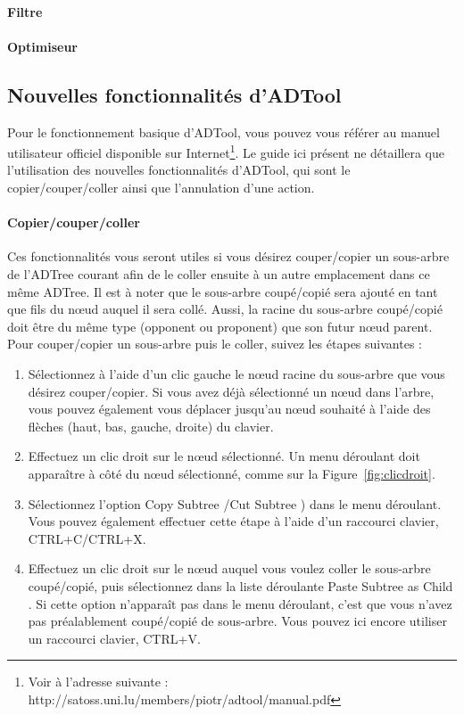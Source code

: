 \paragraph{Filtre}

\paragraph{Optimiseur}

\subsection{Nouvelles fonctionnalités d'ADTool}
\label{ssec:manuelADTool}

Pour le fonctionnement basique d'ADTool, vous pouvez vous référer au manuel utilisateur officiel disponible sur Internet\footnote{Voir à l'adresse suivante : http://satoss.uni.lu/members/piotr/adtool/manual.pdf}. Le guide ici présent ne détaillera que l'utilisation des nouvelles fonctionnalités d'ADTool, qui sont le copier/couper/coller ainsi que l'annulation d'une action.

\paragraph{Copier/couper/coller} Ces fonctionnalités vous seront utiles si vous désirez couper/copier un sous-arbre de l'ADTree courant afin de le coller ensuite à un autre emplacement dans ce même ADTree. Il est à noter que le sous-arbre coupé/copié sera ajouté en tant que fils du n\oe{}ud auquel il sera collé. Aussi, la racine du sous-arbre coupé/copié doit être du même type (opponent ou proponent) que son futur n\oe{}ud parent. Pour couper/copier un sous-arbre puis le coller, suivez les étapes suivantes : 
\begin{enumerate}
    \item Sélectionnez à l'aide d'un clic gauche le n\oe{}ud racine du sous-arbre que vous désirez couper/copier. Si vous avez déjà sélectionné un n\oe{}ud dans l'arbre, vous pouvez également vous déplacer jusqu'au n\oe{}ud souhaité à l'aide des flèches (haut, bas, gauche, droite) du clavier.
	\item Effectuez un clic droit sur le n\oe{}ud sélectionné. Un menu déroulant doit apparaître à côté du n\oe{}ud sélectionné, comme sur la {\sc Figure}~\ref{fig:clicdroit}.
	\item Sélectionnez l'option \og Copy Subtree \fg{}/\og Cut Subtree \fg{}) dans le menu déroulant. Vous pouvez également effectuer cette étape à l'aide d'un raccourci clavier, {\sc CTRL+C}/{\sc CTRL+X}.
	\item Effectuez un clic droit sur le n\oe{}ud auquel vous voulez coller le sous-arbre coupé/copié, puis sélectionnez dans la liste déroulante \og Paste Subtree as Child \fg{}. Si cette option n'apparaît pas dans le menu déroulant, c'est que vous n'avez pas préalablement coupé/copié de sous-arbre. Vous pouvez ici encore utiliser un raccourci clavier, {\sc CTRL+V}.
\end{enumerate}

